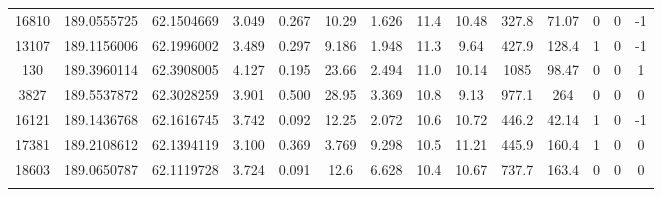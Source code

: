 \begin{table*}
\begin{center}
\begin{tabular}{ cccccccccccccc }
       16810 & 189.0555725 &  62.1504669 &  3.049 &  0.267 &     10.29 &     1.626 &    11.4 &   10.48 &     327.8 &     71.07 &      0 &      0 &       -1 \\ 
       13107 & 189.1156006 &  62.1996002 &  3.489 &  0.297 &     9.186 &     1.948 &    11.3 &    9.64 &     427.9 &     128.4 &      1 &      0 &       -1 \\ 
         130 & 189.3960114 &  62.3908005 &  4.127 &  0.195 &     23.66 &     2.494 &    11.0 &   10.14 &      1085 &     98.47 &      0 &      0 &        1 \\ 
        3827 & 189.5537872 &  62.3028259 &  3.901 &  0.500 &     28.95 &     3.369 &    10.8 &    9.13 &     977.1 &       264 &      0 &      0 &        0 \\ 
       16121 & 189.1436768 &  62.1616745 &  3.742 &  0.092 &     12.25 &     2.072 &    10.6 &   10.72 &     446.2 &     42.14 &      1 &      0 &       -1 \\ 
       17381 & 189.2108612 &  62.1394119 &  3.100 &  0.369 &     3.769 &     9.298 &    10.5 &   11.21 &     445.9 &     160.4 &      1 &      0 &        0 \\ 
       18603 & 189.0650787 &  62.1119728 &  3.724 &  0.091 &      12.6 &     6.628 &    10.4 &   10.67 &     737.7 &     163.4 &      0 &      0 &        0 \\ 
    
    \hline

    \vspace{-0.5ex}


\end{tabular}

\begin{minipage}{0.95\textwidth}
    

\end{minipage}
\end{center}
\end{table*}

